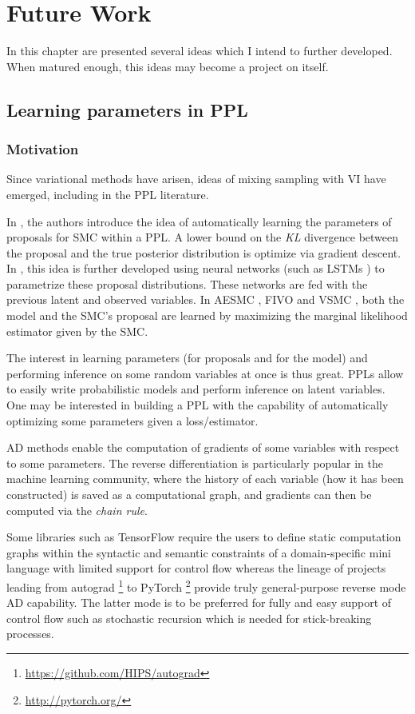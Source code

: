 \chapter{Future Work}
In this chapter are presented several ideas which I intend to further developed. When matured enough, this ideas may become a project on itself.


\section{Learning parameters in PPL}
\subsection{Motivation}
Since variational methods have arisen, ideas of mixing sampling with \gls{VI} have emerged, including in the \gls{PPL} literature.

In \cite{Wingate:2013tq}, the authors introduce the idea of automatically learning the parameters of proposals for \gls{SMC} within a \gls{PPL}. A lower bound on the \emph{KL} divergence between the proposal and the true posterior distribution is optimize via gradient descent.
In \cite{Ritchie:2016ve, Le:2016te}, this idea is further developed using neural networks (such as LSTMs \cite{Hochreiter:1997fq}) to parametrize these proposal distributions. These networks are fed with the previous latent and observed variables.
In AESMC \cite{Le:2017wm}, FIVO \cite{Maddison:2017wp} and VSMC \cite{Naesseth:2017tl}, both the model and the \gls{SMC}'s proposal are learned by maximizing the marginal likelihood estimator given by the \gls{SMC}.

The interest in learning parameters (for proposals and for the model) and performing inference on some random variables at once is thus great. \gls{PPL}s allow to easily write probabilistic models and perform inference on latent variables. One may be interested in building a \gls{PPL} with the capability of automatically optimizing some parameters given a loss/estimator.

\gls{AD} methods \cite{Baydin:2015up} enable the computation of gradients of some variables with respect to some parameters. The reverse differentiation is particularly popular in the machine learning community, where the history of each variable (how it has been constructed) is saved as a computational graph, and gradients can then be computed via the \textit{chain rule}.

Some libraries such as TensorFlow \cite{Tensorflow} require the users to define static computation graphs within the syntactic and semantic constraints of a domain-specific mini language with limited support for control flow whereas the lineage of projects leading from autograd \footnote{\url{https://github.com/HIPS/autograd}} to PyTorch \footnote{\url{http://pytorch.org/}} provide truly general-purpose reverse mode \gls{AD} capability. The latter mode is to be preferred for fully and easy support of control flow such as stochastic recursion which is needed for stick-breaking processes.


